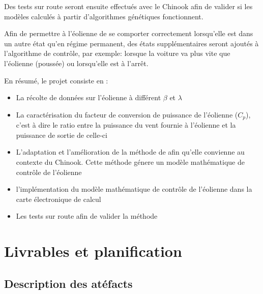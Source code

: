 \documentclass[11pt]{article}
\begin{document}
Des tests sur route seront ensuite effectués avec le Chinook afin de valider si les modèles calculés à partir d'algorithmes génétiques fonctionnent.

Afin de permettre à l'éolienne de se comporter correctement lorsqu'elle est dans un autre état qu'en régime permanent, des états supplémentaires seront ajoutés à l'algorithme de contrôle, par exemple: lorsque la voiture va plus vite que l'éolienne (poussée) ou lorsqu'elle est à l'arrêt.


En résumé, le projet consiste en :
\begin{itemize}
  \item La récolte de données sur l'éolienne à différent $\beta$ et $\lambda$
  \item La caractérisation du facteur de conversion de puissance de l'éolienne ($C_p$), c'est à dire le ratio entre la puissance du vent fournie à l'éolienne et la puissance de sortie de celle-ci
  \item L'adaptation et l'amélioration de la méthode de \cite{Ouissam12} afin qu'elle convienne au contexte du Chinook. Cette méthode génere un modèle mathématique de contrôle de l'éolienne
  \item l'implémentation du modèle mathématique de contrôle de l'éolienne dans la carte électronique de calcul
  \item Les tests sur route afin de valider la méthode
\end{itemize}

\section{Livrables et planification}

\subsection{Description des atéfacts}
\end{document}
